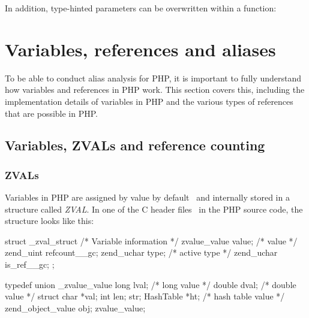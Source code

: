 
In addition, type-hinted parameters can be overwritten within a function:


\section{Variables, references and aliases}

To be able to conduct alias analysis for PHP, it is important to fully understand how variables and references in PHP work. This section covers this, including the implementation details of variables in PHP and the various types of references that are possible in PHP.


\subsection{Variables, ZVALs and reference counting}


\subsubsection{ZVALs}
\label{sec:zvals}

Variables in PHP are assigned by value by default~\cite{php-manual-variables} and internally stored in a structure called \emph{ZVAL}. In one of the C header files~\cite{php-src-api-headers} in the PHP source code, the structure looks like this:

\begin{ccode}
struct _zval_struct {
  /* Variable information */
  zvalue_value value;       /* value */
  zend_uint refcount__gc;
  zend_uchar type;          /* active type */
  zend_uchar is_ref__gc;
};

typedef union _zvalue_value {
  long lval;     /* long value */
  double dval;   /* double value */
  struct {
    char *val;
    int len;
  } str;
  HashTable *ht;  /* hash table value */
  zend_object_value obj;
} zvalue_value;
\end{ccode}

